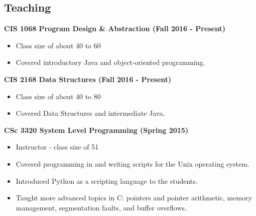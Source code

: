 \documentclass{res}
\begin{document}
\begin{resume}

\newpage
\section{Teaching}


\textbf{CIS 1068 Program Design \& Abstraction (Fall 2016 -  Present)}
\begin{itemize}
	\item Class size of about 40 to 60
	\item Covered introductory Java and object-oriented programming.
\end{itemize}


\textbf{CIS 2168 Data Structures (Fall 2016 -  Present)}
\begin{itemize}
	\item Class size of about 40 to 80
	\item Covered Data Structures and intermediate Java.
\end{itemize}


{\bf CSc 3320  System Level Programming (Spring 2015) }
\begin{itemize}
	\item Instructor - class size of 51
	\item Covered programming in and writing scripts for the Unix operating system.
	\item Introduced Python as a scripting language to the students.
	\item Taught more advanced topics in C: pointers and pointer arithmetic, memory management, segmentation faults, and buffer overflows.
\end{itemize}



\end{resume}
\end{document}
